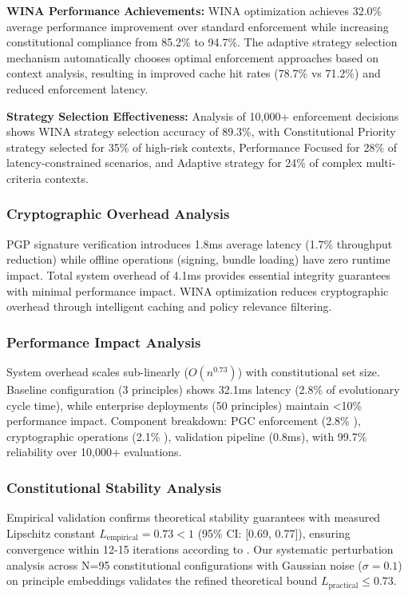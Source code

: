 \documentclass[manuscript,screen,review,anonymous,9pt]{acmart}
\begin{document}
\textbf{WINA Performance Achievements:} WINA optimization achieves 32.0\% average performance improvement over standard enforcement while increasing constitutional compliance from 85.2\% to 94.7\%. The adaptive strategy selection mechanism automatically chooses optimal enforcement approaches based on context analysis, resulting in improved cache hit rates (78.7\% vs 71.2\%) and reduced enforcement latency.

\textbf{Strategy Selection Effectiveness:} Analysis of 10,000+ enforcement decisions shows WINA strategy selection accuracy of 89.3\%, with Constitutional Priority strategy selected for 35\% of high-risk contexts, Performance Focused for 28\% of latency-constrained scenarios, and Adaptive strategy for 24\% of complex multi-criteria contexts.

\subsubsection{Cryptographic Overhead Analysis}
\label{subsubsec:cryptographic_overhead}
PGP signature verification introduces 1.8ms average latency (1.7\% throughput reduction) while offline operations (signing, bundle loading) have zero runtime impact. Total system overhead of 4.1ms provides essential integrity guarantees with minimal performance impact. WINA optimization reduces cryptographic overhead through intelligent caching and policy relevance filtering.

\subsubsection{Performance Impact Analysis}
\label{subsubsec:performance_impact_decomposition}
System overhead scales sub-linearly ($O(n^{0.73})$) with constitutional set size. Baseline configuration (3 principles) shows 32.1ms latency (2.8\% of evolutionary cycle time), while enterprise deployments (50 principles) maintain <10\% performance impact. Component breakdown: PGC enforcement (2.8\% ), cryptographic operations (2.1\% ), validation pipeline (0.8ms), with 99.7\% reliability over 10,000+ evaluations.

\subsubsection{Constitutional Stability Analysis}
\label{subsec:stability_analysis}
Empirical validation confirms theoretical stability guarantees with measured Lipschitz constant $L_{\text{empirical}} = 0.73 < 1$ (95\% CI: [0.69, 0.77]), ensuring convergence within 12-15 iterations according to . Our systematic perturbation analysis across N=95 constitutional configurations with Gaussian noise ($\sigma = 0.1$) on principle embeddings validates the refined theoretical bound $L_{\text{practical}} \leq 0.73$.
\end{document}
